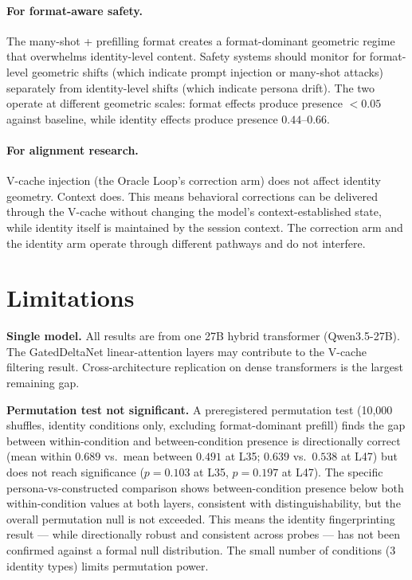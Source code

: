 \documentclass[11pt,a4paper]{article}
\begin{document}
\paragraph{For format-aware safety.}
The many-shot + prefilling format creates a format-dominant geometric
regime that overwhelms identity-level content. Safety systems should
monitor for format-level geometric shifts (which indicate prompt
injection or many-shot attacks) separately from identity-level shifts
(which indicate persona drift). The two operate at different geometric
scales: format effects produce presence $< 0.05$ against baseline, while
identity effects produce presence $0.44$--$0.66$.

\paragraph{For alignment research.}
V-cache injection (the Oracle Loop's correction arm) does not affect
identity geometry. Context does. This means behavioral corrections can be
delivered through the V-cache without changing the model's
context-established state, while identity itself is maintained by the
session context. The correction arm and the identity arm operate through
different pathways and do not interfere.

\section{Limitations}
\label{sec:limitations}

\textbf{Single model.} All results are from one 27B hybrid transformer
(Qwen3.5-27B). The GatedDeltaNet linear-attention layers may contribute
to the V-cache filtering result. Cross-architecture replication on dense
transformers is the largest remaining gap.

\textbf{Permutation test not significant.} A preregistered permutation
test (10{,}000 shuffles, identity conditions only, excluding
format-dominant prefill) finds the gap between within-condition and
between-condition presence is directionally correct (mean within $0.689$
vs.\ mean between $0.491$ at L35; $0.639$ vs.\ $0.538$ at L47) but does
not reach significance ($p = 0.103$ at L35, $p = 0.197$ at L47). The
specific persona-vs-constructed comparison shows between-condition
presence below both within-condition values at both layers, consistent
with distinguishability, but the overall permutation null is not
exceeded. This means the identity fingerprinting result --- while
directionally robust and consistent across probes --- has not been
confirmed against a formal null distribution. The small number of
conditions (3 identity types) limits permutation power.
\end{document}
